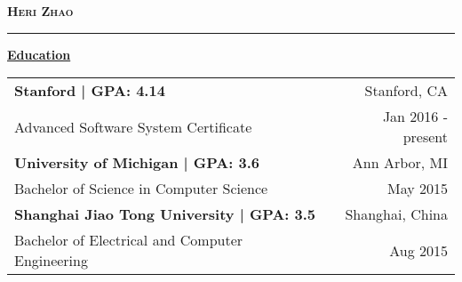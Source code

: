 \documentclass[12pt]{article}
\begin{document}
    \thispagestyle{empty}

    \noindent\begin{multicols}{3}
    \columnbreak
    \begin{center}\textsc{\textbf{\LARGE{Heri Zhao}}}\end{center}
    \columnbreak
    \end{multicols}\vspace{-0.9em}
    \hrule height 0.4pt
    
    \begin{center}\textrm{\textbf{\large{\underline{Education}}}}\end{center}
    \begin{tabularx}{\textwidth}{X r}
        \small{\textsf{\textbf{Stanford | GPA: 4.14}}} & \small{\textsf{Stanford, CA}} \\
        \small{\textsf{Advanced Software System Certificate}} & \small{\textsf{Jan 2016 - present}} \\
        \small{\textsf{\textbf{University of Michigan | GPA: 3.6}}} & \small{\textsf{Ann Arbor, MI}} \\
        \small{\textsf{Bachelor of Science in Computer Science}} & \small{\textsf{May 2015}} \\
        \small{\textsf{\textbf{Shanghai Jiao Tong University | GPA: 3.5}}} & \small{\textsf{Shanghai, China}} \\
        \small{\textsf{Bachelor of Electrical and Computer Engineering}} & \small{\textsf{Aug 2015}}
    \end{tabularx}
    
\end{document}
